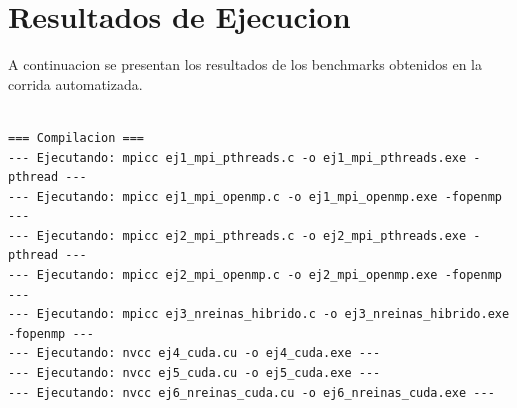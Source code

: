 \documentclass{article}
\begin{document}
\section{Resultados de Ejecucion}
A continuacion se presentan los resultados de los benchmarks obtenidos en la corrida automatizada.\\ \\
\begin{verbatim}
=== Compilacion ===
--- Ejecutando: mpicc ej1_mpi_pthreads.c -o ej1_mpi_pthreads.exe -pthread ---
--- Ejecutando: mpicc ej1_mpi_openmp.c -o ej1_mpi_openmp.exe -fopenmp ---
--- Ejecutando: mpicc ej2_mpi_pthreads.c -o ej2_mpi_pthreads.exe -pthread ---
--- Ejecutando: mpicc ej2_mpi_openmp.c -o ej2_mpi_openmp.exe -fopenmp ---
--- Ejecutando: mpicc ej3_nreinas_hibrido.c -o ej3_nreinas_hibrido.exe -fopenmp ---
--- Ejecutando: nvcc ej4_cuda.cu -o ej4_cuda.exe ---
--- Ejecutando: nvcc ej5_cuda.cu -o ej5_cuda.exe ---
--- Ejecutando: nvcc ej6_nreinas_cuda.cu -o ej6_nreinas_cuda.exe ---


\end{verbatim}
\end{document}
